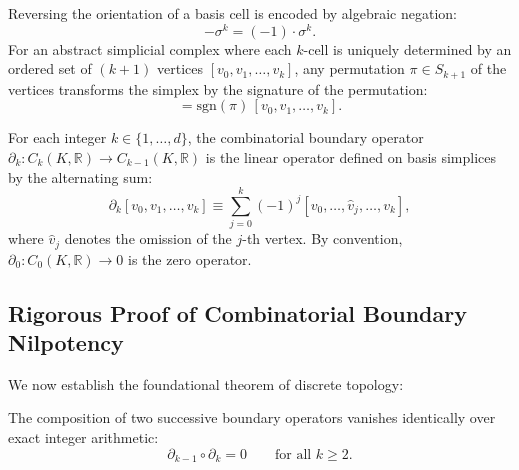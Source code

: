 Reversing the orientation of a basis cell is encoded by algebraic negation:
\begin{equation}
\label{eq:cell_negation_orientation}
-\sigma^k = (-1) \cdot \sigma^k.
\end{equation}
For an abstract simplicial complex where each $k$-cell is uniquely determined by an ordered set of $(k+1)$ vertices $[v_0, v_1, \dots, v_k]$, any permutation $\pi \in S_{k+1}$ of the vertices transforms the simplex by the signature of the permutation:
\begin{equation}
[v_{\pi(0)}, v_{\pi(1)}, \dots, v_{\pi(k)}] = \mathrm{sgn}(\pi) \, [v_0, v_1, \dots, v_k].
\end{equation}

\begin{definition}
\label{def:boundary_operator}
For each integer $k \in \{1, \dots, d\}$, the combinatorial boundary operator $\partial_k : C_k(K, \mathbb{R}) \to C_{k-1}(K, \mathbb{R})$ is the linear operator defined on basis simplices by the alternating sum:
\begin{equation}
\label{eq:boundary_operator_def}
\partial_k [v_0, v_1, \dots, v_k] \equiv \sum_{j=0}^k (-1)^j [v_0, \dots, \hat{v}_j, \dots, v_k],
\end{equation}
where $\hat{v}_j$ denotes the omission of the $j$-th vertex. By convention, $\partial_0 : C_0(K, \mathbb{R}) \to 0$ is the zero operator.
\end{definition}

\subsection{Rigorous Proof of Combinatorial Boundary Nilpotency}
\label{subsec:nilpotency_proof}

We now establish the foundational theorem of discrete topology:

\begin{theorem}
\label{thm:boundary_nilpotency}
The composition of two successive boundary operators vanishes identically over exact integer arithmetic:
\begin{equation}
\label{eq:boundary_nilpotency}
\partial_{k-1} \circ \partial_k = 0 \qquad \text{for all } k \ge 2.
\end{equation}
\end{theorem}

